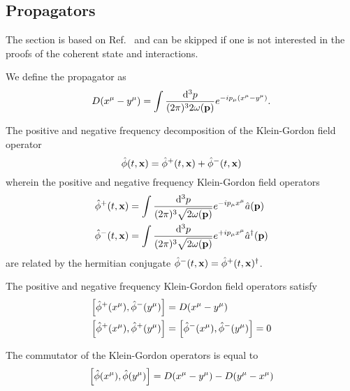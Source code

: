 \subsection{Propagators}

The section is based on Ref.~\cite[p.~26]{Peskin1995} and can be skipped if one is not interested in the proofs of the coherent state and interactions.
\begin{definition}[Propagator]
	We define the propagator as
	\begin{equation}
		D(x^\mu-y^\mu)
		=
		\int\frac{\dd[3]{p}}{(2\pi)^32\omega(\vb{p})}
		e^{-ip_\mu (x^\mu-y^\mu)}
		.
	\end{equation}
\end{definition}
\begin{definition}
	The positive and negative frequency decomposition of the Klein-Gordon field operator
	\begin{equation}
		\hat\phi(t,\vb{x})
		=
		\hat\phi^+(t,\vb{x})
		+
		\hat\phi^-(t,\vb{x})
	\end{equation}
	wherein the positive and negative frequency Klein-Gordon field operators
	\begin{equation}
		\begin{split}
			\hat\phi^+(t,\vb{x})
			&=
			\int\frac{\dd[3]{p}}{(2\pi)^3\sqrt{2\omega(\vb{p})}}
			e^{-ip_\mu x^\mu}
			\hat{a}(\vb{p})
			\\
			\hat\phi^-(t,\vb{x})
			&=
			\int\frac{\dd[3]{p}}{(2\pi)^3\sqrt{2\omega(\vb{p})}}
			e^{+ip_\mu x^\mu}
			\hat{a}^\dagger(\vb{p})
		\end{split}
		\label{eq:qkg_positive_negative_frequency}
	\end{equation}
	are related by the hermitian conjugate $\hat\phi^-(t,\vb{x})=\hat\phi^+(t,\vb{x})^\dagger$.
\end{definition}
\begin{lemma}\label{thm:qkg_full_comm_pn_comm}
	The positive and negative frequency Klein-Gordon field operators satisfy
	\begin{align}
		\comm{\hat\phi^+(x^\mu)}{\hat\phi^-(y^\mu)}
		&=
		D(x^\mu-y^\mu)
		\\
		\comm{\hat\phi^+(x^\mu)}{\hat\phi^+(y^\mu)}
		&=
		\comm{\hat\phi^-(x^\mu)}{\hat\phi^-(y^\mu)}
		=
		0
	\end{align}
\end{lemma}
\begin{lemma}\label{thm:qkg_propagator_kg_comm}
	The commutator of the Klein-Gordon operators is equal to
	\begin{equation}
		\comm{\hat\phi(x^\mu)}{\hat\phi(y^\mu)}
		=
		D(x^\mu-y^\mu)
		-
		D(y^\mu-x^\mu)
	\end{equation}
\end{lemma}
